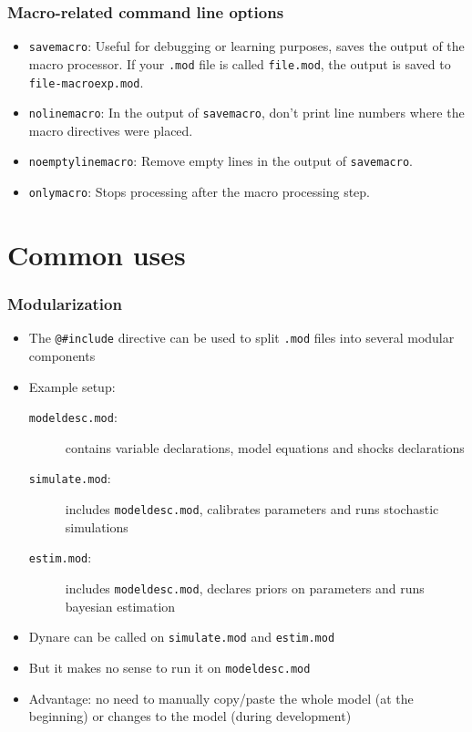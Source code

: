 \documentclass{beamer}
\begin{document}
\begin{frame}
  \frametitle{Macro-related command line options}
  \begin{itemize}
  \item \texttt{savemacro}: Useful for debugging or learning purposes, saves the output of the macro processor. If your \texttt{.mod} file is called \texttt{file.mod}, the output is saved to \texttt{file-macroexp.mod}.
  \item \texttt{nolinemacro}: In the output of \texttt{savemacro}, don't print line numbers where the macro directives were placed.
  \item \texttt{noemptylinemacro}: Remove empty lines in the output of \texttt{savemacro}.
  \item \texttt{onlymacro}: Stops processing after the macro processing step.
  \end{itemize}
\end{frame}

\section{Common uses}

\begin{frame}[fragile=singleslide]
  \frametitle{Modularization}
  \begin{itemize}
  \item The \verb+@#include+ directive can be used to split \texttt{.mod} files into several modular components
  \item Example setup:
    \begin{description}
    \item[\texttt{modeldesc.mod}:] contains variable declarations, model equations and shocks declarations
    \item[\texttt{simulate.mod}:] includes \texttt{modeldesc.mod}, calibrates parameters and runs stochastic simulations
    \item[\texttt{estim.mod}:] includes \texttt{modeldesc.mod}, declares priors on parameters and runs bayesian estimation
    \end{description}
  \item Dynare can be called on \texttt{simulate.mod} and \texttt{estim.mod}
  \item But it makes no sense to run it on \texttt{modeldesc.mod}
  \item Advantage: no need to manually copy/paste the whole model (at the beginning) or changes to the model (during development)
  \end{itemize}
\end{frame}
\end{document}
